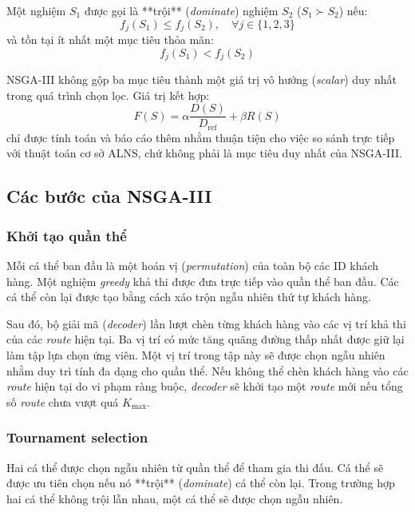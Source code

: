 \documentclass{article}
\begin{document}
Một nghiệm $S_1$ được gọi là **trội** (\textit{dominate}) nghiệm $S_2$ ($S_1 \succ S_2$) nếu:
\begin{equation}
    f_j(S_1) \le f_j(S_2), \quad \forall j \in \{1, 2, 3\}
\end{equation}
và tồn tại ít nhất một mục tiêu thỏa mãn:
\begin{equation}
    f_j(S_1) < f_j(S_2)
\end{equation}

NSGA-III không gộp ba mục tiêu thành một giá trị vô hướng (\textit{scalar}) duy nhất trong quá trình chọn lọc. Giá trị kết hợp:
\begin{equation}
    F(S) = \alpha \frac{D(S)}{D_{\text{ref}}} + \beta R(S)
\end{equation}
chỉ được tính toán và báo cáo thêm nhằm thuận tiện cho việc so sánh trực tiếp với thuật toán cơ sở ALNS, chứ không phải là mục tiêu duy nhất của NSGA-III.

\subsection{Các bước của NSGA-III}

\subsubsection{Khởi tạo quần thể}
Mỗi cá thể ban đầu là một hoán vị (\textit{permutation}) của toàn bộ các ID khách hàng. Một nghiệm \textit{greedy} khả thi được đưa trực tiếp vào quần thể ban đầu. Các cá thể còn lại được tạo bằng cách xáo trộn ngẫu nhiên thứ tự khách hàng.

Sau đó, bộ giải mã (\textit{decoder}) lần lượt chèn từng khách hàng vào các vị trí khả thi của các \textit{route} hiện tại. Ba vị trí có mức tăng quãng đường thấp nhất được giữ lại làm tập lựa chọn ứng viên. Một vị trí trong tập này sẽ được chọn ngẫu nhiên nhằm duy trì tính đa dạng cho quần thể. Nếu không thể chèn khách hàng vào các \textit{route} hiện tại do vi phạm ràng buộc, \textit{decoder} sẽ khởi tạo một \textit{route} mới nếu tổng số \textit{route} chưa vượt quá $K_{\max}$.

\subsubsection{Tournament selection}
Hai cá thể được chọn ngẫu nhiên từ quần thể để tham gia thi đấu. Cá thể sẽ được ưu tiên chọn nếu nó **trội** (\textit{dominate}) cá thể còn lại. Trong trường hợp hai cá thể không trội lẫn nhau, một cá thể sẽ được chọn ngẫu nhiên.
\end{document}
